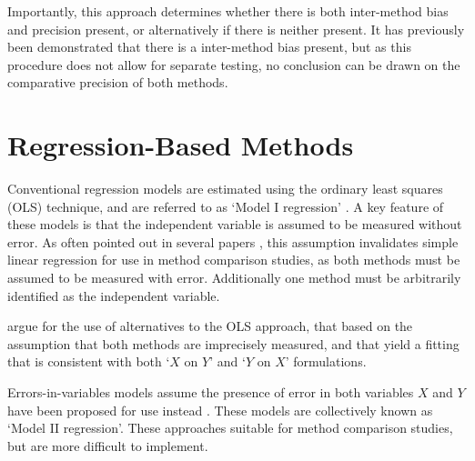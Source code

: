 \documentclass[12pt, a4paper]{report}
\theoremstyle{plain}
\theoremstyle{definition}
\theoremstyle{remark}
\begin{document}
Importantly, this approach determines whether there is both inter-method bias and precision present, or alternatively if there is neither present. It has previously been demonstrated that there is a inter-method bias present, but as this procedure does not
allow for separate testing, no conclusion can be drawn on the
comparative precision of both methods.










\section{Regression-Based Methods}
Conventional regression models are estimated using the ordinary least squares (OLS) technique, and are referred to as `Model I regression' \citep{CornCoch,ludbrook97}. A key feature of these models is that the independent variable is assumed to be measured without error. As often pointed out in several papers \citep{BA83,ludbrook97}, this assumption invalidates simple linear regression for use in method comparison studies, as both methods must be assumed to be measured with error. Additionally one method must be arbitrarily identified as the independent variable.

\citet{CornCoch} argue for the use of alternatives to the OLS approach, that based on the assumption that both methods are imprecisely measured, and that yield a fitting that is consistent with both `$X$ on $Y$' and `$Y$ on $X$' formulations. 

Errors-in-variables models assume the presence of error in both variables $X$ and $Y$ have been proposed for use instead \citep{CornCoch,ludbrook97}. These models are collectively known as `Model II regression'. These approaches suitable for method comparison studies, but are more difficult to implement. 
\end{document}
